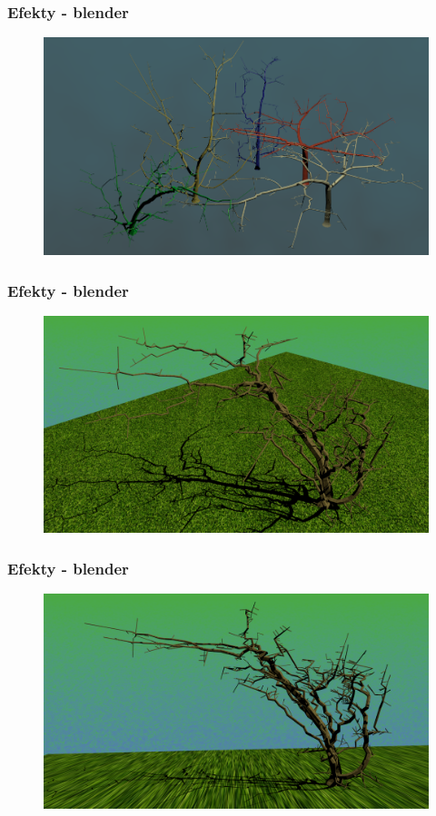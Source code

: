\documentclass[blue,table]{beamer}
\begin{document}
\begin{frame}\frametitle{Efekty - blender}
\begin{figure}
\includegraphics[scale=0.4]{img/blender/blender3.png} 
\end{figure}
\end{frame}

\begin{frame}\frametitle{Efekty - blender}
\begin{figure}
\includegraphics[scale=0.25]{img/blender/blender4.png} 
\end{figure}
\end{frame}
\begin{frame}\frametitle{Efekty - blender}
\begin{figure}
\includegraphics[scale=0.25]{img/blender/blender5.png} 
\end{figure}
\end{frame}
\end{document}
